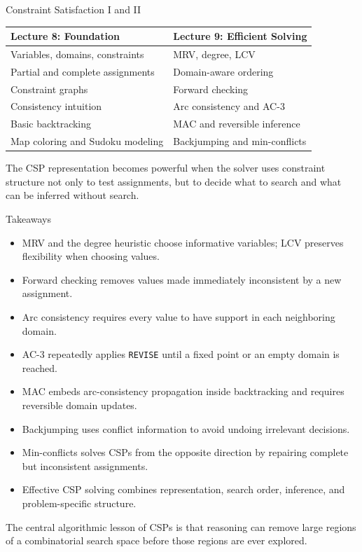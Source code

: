 \documentclass[aspectratio=169,10pt]{beamer}
\begin{document}
\begin{frame}[shrink=20]{Constraint Satisfaction I and II}
  \begin{center}
  \renewcommand{\arraystretch}{1.32}
  \begin{tabular}{l|l}
    \textbf{Lecture 8: Foundation} & \textbf{Lecture 9: Efficient Solving} \\\hline
    Variables, domains, constraints & MRV, degree, LCV \\
    Partial and complete assignments & Domain-aware ordering \\
    Constraint graphs & Forward checking \\
    Consistency intuition & Arc consistency and AC-3 \\
    Basic backtracking & MAC and reversible inference \\
    Map coloring and Sudoku modeling & Backjumping and min-conflicts
  \end{tabular}
  \end{center}

  \begin{keyidea}
    The CSP representation becomes powerful when the solver uses constraint structure not only to test assignments, but to decide what to search and what can be inferred without search.
  \end{keyidea}
\end{frame}

\begin{frame}[shrink=20]{Takeaways}
  \begin{itemize}
    \item MRV and the degree heuristic choose informative variables; LCV preserves flexibility when choosing values.
    \item Forward checking removes values made immediately inconsistent by a new assignment.
    \item Arc consistency requires every value to have support in each neighboring domain.
    \item AC-3 repeatedly applies \texttt{REVISE} until a fixed point or an empty domain is reached.
    \item MAC embeds arc-consistency propagation inside backtracking and requires reversible domain updates.
    \item Backjumping uses conflict information to avoid undoing irrelevant decisions.
    \item Min-conflicts solves CSPs from the opposite direction by repairing complete but inconsistent assignments.
    \item Effective CSP solving combines representation, search order, inference, and problem-specific structure.
  \end{itemize}

  \begin{keyidea}
    The central algorithmic lesson of CSPs is that reasoning can remove large regions of a combinatorial search space before those regions are ever explored.
  \end{keyidea}
\end{frame}
\end{document}
